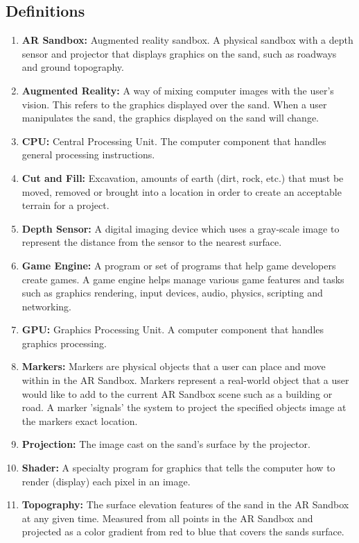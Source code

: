 \documentclass[letterpaper, 10pt, onecolumn, draftclsnofoot]{IEEEtran}
\begin{document}
    \subsection{\textbf{Definitions}}
    \begin{enumerate}[\label={}]
        \item {\textbf{AR Sandbox:} Augmented reality sandbox. A physical sandbox with a depth sensor and projector that displays graphics on the sand, such as roadways and ground topography.}
        
        \item {\textbf{Augmented Reality:} A way of mixing computer images with the user’s vision. This refers to the graphics displayed over the sand. When a user manipulates the sand, the graphics displayed on the sand will change.} 
        
        \item {\textbf{CPU:} Central Processing Unit. The computer component that handles general processing instructions.}
         
        \item {\textbf{Cut and Fill:} Excavation, amounts of earth (dirt, rock, etc.) that must be moved, removed or brought into a location in order to create an acceptable terrain for a project.}
        
        \item {\textbf{Depth Sensor:} A digital imaging device which uses a gray-scale image to represent the distance from the sensor to the nearest surface.}
        
        \item{\textbf{Game Engine:} A program or set of programs that help game developers create games. A game engine helps manage various game features and tasks such as graphics rendering, input devices, audio, physics, scripting and networking.}
        
        \item {\textbf{GPU:} Graphics Processing Unit. A computer component that handles graphics processing.}
        
        \item {\textbf{Markers:} Markers are physical objects that a user can place and move within in the AR Sandbox. Markers represent a real-world object that a user would like to add to the current AR Sandbox scene such as a building or road. A marker 'signals' the system to project the specified objects image at the markers exact location.}       
        
        \item {\textbf{Projection:} The image cast on the sand’s surface by the projector.}
        
        \item{\textbf{Shader:} A specialty program for graphics that tells the computer how to render (display) each pixel in an image.}
        
        \item {\textbf{Topography:} The surface elevation features of the sand in the AR Sandbox at any given time. Measured from all points in the AR Sandbox and projected as a color gradient from red to blue that covers the sands surface.}
    \end{enumerate}
\end{document}

